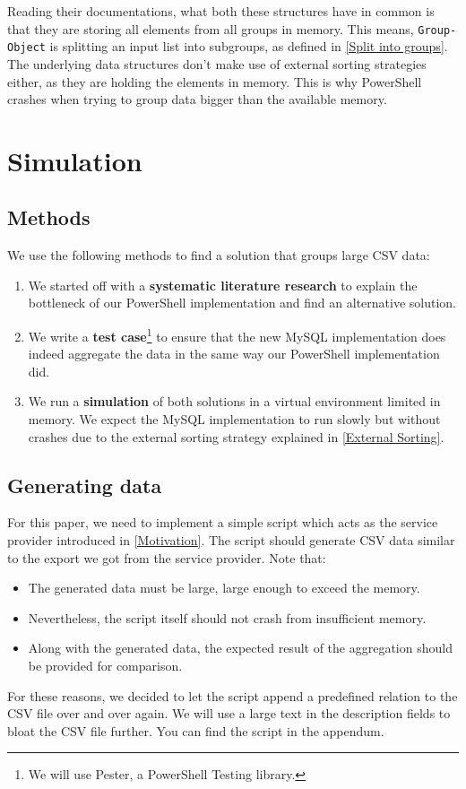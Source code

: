 Reading their documentations, what both these structures have in common
is that they are storing all elements from all groups in memory. This means,
\verb+Group-Object+ is splitting an input list into subgroups,
as defined in \ref{Split into groups}. The underlying data structures
don't make use of external sorting strategies either, as they are
holding the elements in memory. This is why PowerShell crashes when
trying to group data bigger than the available memory.

\newpage

\section{Simulation}

\subsection{Methods}

We use the following methods to find a solution that groups large CSV data:

\begin{enumerate}
    \item We started off with a \textbf{systematic literature research}
        to explain the bottleneck of our PowerShell implementation
        and find an alternative solution.
    \item We write a \textbf{test case}\footnote{We will use Pester,
        a PowerShell Testing library.} to ensure that the new
        MySQL implementation does indeed aggregate the data in the same way
        our PowerShell implementation did.
    \item We run a \textbf{simulation} of both solutions in a virtual
        environment limited in memory. We expect the MySQL implementation
        to run slowly but without crashes due to the external sorting
        strategy explained in \ref{External Sorting}.
\end{enumerate}

\subsection{Generating data}

For this paper, we need to implement a simple script which acts as the
service provider introduced in \ref{Motivation}. The script
should generate CSV data similar to the export we got from
the service provider. Note that:
\begin{itemize}
    \item The generated data must be large, large enough to exceed
        the memory.
    \item Nevertheless, the script itself should not crash from
        insufficient memory.
    \item Along with the generated data, the expected result of the
        aggregation should be provided for comparison.
\end{itemize}
For these reasons, we decided to let the script append a predefined
relation to the CSV file over and over again. We will use a large
text in the description fields to bloat the CSV file further.
You can find the script in the appendum.